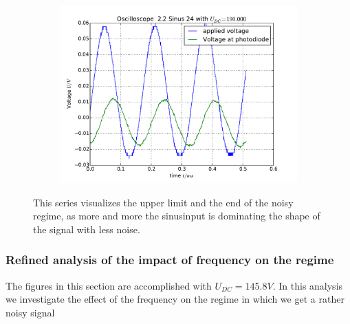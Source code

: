 \begin{figure}
\begin{subfigure}[b]{\picwidth}
        \caption{}
    \end{subfigure}
    \begin{subfigure}[b]{\picwidth}
        \includegraphics[width=\textwidth]{analysis/figures/22sinus24}
        \caption{}
    \end{subfigure}

    \caption{This series visualizes the upper limit and the end
        of the noisy regime, as more and more the sinusinput
        is dominating the shape of the signal with less noise.}
    \label{fig:sinus4}
\end{figure}
\clearpage
\subsubsection{Refined analysis of the impact of frequency on 
    the regime}
The figures in this section are accomplished with $U_{DC}=145.8 V$.
In this analysis we investigate the effect of the frequency
on the regime in which we get a rather noisy signal 

